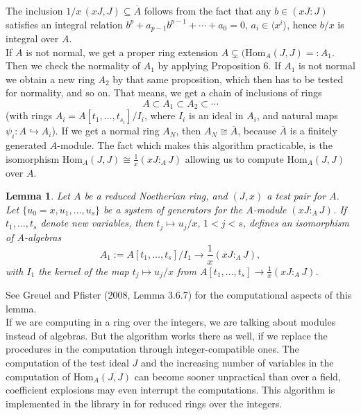 \documentclass{article}
\newtheorem{lem}[thm]{Lemma}
\begin{document}
{\noindent
The inclusion $1/x\,(xJ,J)\subseteq\overline{A}$ follows from the fact 
that any $b\in(xJ:J)$ satisfies an integral relation 
$b^p+a_{p-1}b^{p-1}+\cdots+a_0=0,\, a_i\in\langle x^i\rangle$, hence $b/x$
is integral over $A$.\\

\noindent
If $A$ is not normal, we get a proper ring extension 
$A\varsubsetneq (\text{Hom}_A(J,J) =: A_1$.
Then we check the normality of $A_1$  by applying Proposition $6$. 
If $A_1$ is not normal we obtain a new ring $A_2$ by that same proposition, 
which then has to be tested for normality, and so on. That means, we get a chain 
of inclusions of rings
$$A \subset A_1 \subset A_2 \subset \cdots$$
(with rings $A_i = A[t_1,\ldots,t_{s_i}]/I_i$, where $I_i$  is an ideal in $A_i$, 
and natural maps $\psi_i : A \hookrightarrow A_i$). 
If we get a normal ring $A_N$, then $A_N\cong \overline{A}$, because 
$\overline{A}$ is a finitely generated $A$-module.
The fact which makes this algorithm practicable, is the isomorphism
$\text{Hom}_A(J,J)\cong \frac{1}{x}(xJ:_AJ)$ allowing us to compute 
$\text{Hom}_A(J,J)$ over $A$.

\begin{lem}
Let $A$ be a reduced Noetherian ring, and $(J,x)$ a test pair for $A$. Let
$\{u_0 = x, u_1,\ldots,u_s\}$ be a system of generators for the $A$-module 
$(xJ:_AJ)$. If $t_1 ,\ldots,t_s$ denote new variables, then 
$t_j \mapsto u_j/x,\,1 < j < s$, defines an isomorphism of $A$-algebras
$$A_1 := A[t_1,\ldots,t_s]/I_1\longrightarrow \frac{1}{x}(xJ :_AJ),$$
with $I_1$ the kernel of the map $t_j\mapsto u_j/x$ from 
$A[t_1,\ldots,t_s]\rightarrow\frac{1}{x}(xJ:_AJ)$.
\end{lem}
See Greuel and Pfister (2008, Lemma 3.6.7) for the computational aspects of this
lemma.\\

\noindent
If we are computing in a ring over the integers, we are talking about modules 
instead of algebras. But the algorithm works there as well, if we replace the 
procedures in the computation through integer-compatible ones.
The computation of the test ideal $J$ and the increasing number of variables
in the computation of $\text{Hom}_A(J,J)$ can become sooner unpractical than 
over a field, coefficient explosions may even interrupt the computations.
This algorithm is implemented in the library {} in {} 
for reduced rings over the integers.\\}
\end{document}
